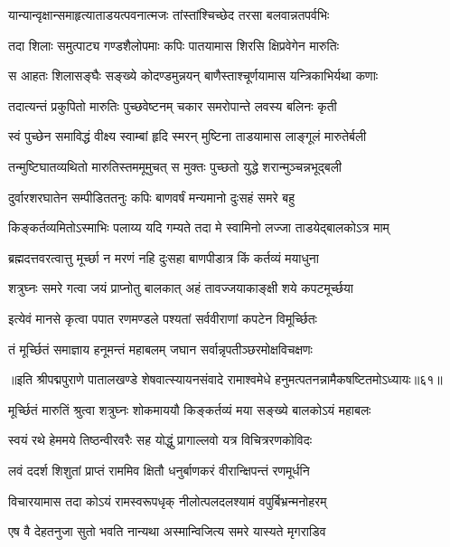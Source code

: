 \twolineshloka
{यान्यान्वृक्षान्समाहृत्याताडयत्पवनात्मजः}
{तांस्तांश्चिच्छेद तरसा बलवान्नतपर्वभिः}%

\twolineshloka
{तदा शिलाः समुत्पाट्य गण्डशैलोपमाः कपिः}
{पातयामास शिरसि क्षिप्रवेगेन मारुतिः}%

\twolineshloka
{स आहतः शिलासङ्घैः सङ्ख्ये कोदण्डमुन्नयन्}
{बाणैस्ताश्चूर्णयामास यन्त्रिकाभिर्यथा कणाः}%

\twolineshloka
{तदात्यन्तं प्रकुपितो मारुतिः पुच्छवेष्टनम्}
{चकार समरोपान्ते लवस्य बलिनः कृती}%

\twolineshloka
{स्वं पुच्छेन समाविद्धं वीक्ष्य स्वाम्बां हृदि स्मरन्}
{मुष्टिना ताडयामास लाङ्गूलं मारुतेर्बली}%

\twolineshloka
{तन्मुष्टिघातव्यथितो मारुतिस्तममूमुचत्}
{स मुक्तः पुच्छतो युद्धे शरान्मुञ्चन्नभूद्बली}%

\twolineshloka
{दुर्वारशरघातेन सम्पीडिततनुः कपिः}
{बाणवर्षं मन्यमानो दुःसहं समरे बहु}%

\twolineshloka
{किङ्कर्तव्यमितोऽस्माभिः पलाय्य यदि गम्यते}
{तदा मे स्वामिनो लज्जा ताडयेद्बालकोऽत्र माम्}%

\twolineshloka
{ब्रह्मदत्तवरत्वात्तु मूर्च्छा न मरणं नहि}
{दुःसहा बाणपीडात्र किं कर्तव्यं मयाधुना}%

\twolineshloka
{शत्रुघ्नः समरे गत्वा जयं प्राप्नोतु बालकात्}
{अहं तावज्जयाकाङ्क्षी शये कपटमूर्च्छया}%

\twolineshloka
{इत्येवं मानसे कृत्वा पपात रणमण्डले}
{पश्यतां सर्ववीराणां कपटेन विमूर्च्छितः}%

\twolineshloka
{तं मूर्च्छितं समाज्ञाय हनूमन्तं महाबलम्}
{जघान सर्वान्नृपतीञ्छरमोक्षविचक्षणः}%

{॥इति श्रीपद्मपुराणे पातालखण्डे शेषवात्स्यायनसंवादे रामाश्वमेधे हनुमत्पतनन्नामैकषष्टितमोऽध्यायः॥६१॥}



\twolineshloka
{मूर्च्छितं मारुतिं श्रुत्वा शत्रुघ्नः शोकमाययौ}
{किङ्कर्तव्यं मया सङ्ख्ये बालकोऽयं महाबलः}%

\twolineshloka
{स्वयं रथे हेममये तिष्ठन्वीरवरैः सह}
{योद्धुं प्रागाल्लवो यत्र विचित्ररणकोविदः}%

\twolineshloka
{लवं ददर्श शिशुतां प्राप्तं राममिव क्षितौ}
{धनुर्बाणकरं वीरान्क्षिपन्तं रणमूर्धनि}%

\twolineshloka
{विचारयामास तदा कोऽयं रामस्वरूपधृक्}
{नीलोत्पलदलश्यामं वपुर्बिभ्रन्मनोहरम्}%

\twolineshloka
{एष वै देहतनुजा सुतो भवति नान्यथा}
{अस्मान्विजित्य समरे यास्यते मृगराडिव}%

